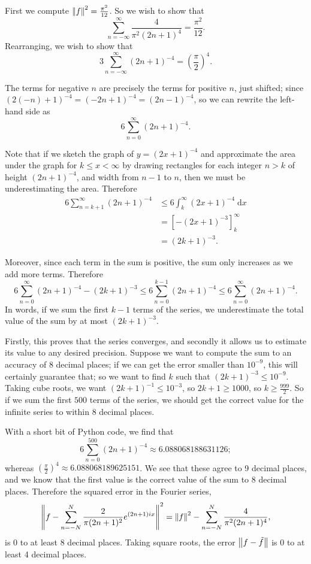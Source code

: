 \documentclass{article}
\newcommand{\diff}{\;\mathrm{d}}
\newcommand{\norm}[1]{\left|\kern-1pt\left|#1\right|\kern-1pt\right|}
\begin{document}
First we compute $\norm{f}^2=\frac{\pi^2}{12}$. So we wish to show that
\[\sum_{n=-\infty}^\infty \frac{4}{\pi^2(2n+1)^4}=\frac{\pi^2}{12}.\]
Rearranging, we wish to show that
\[3\sum_{n=-\infty}^\infty (2n+1)^{-4}=\left(\frac{\pi}{2}\right)^4.\]

The terms for negative $n$ are precisely the terms for positive $n$, just shifted; since $(2(-n)+1)^{-4}=(-2n+1)^{-4}=(2n-1)^{-4}$, so we can rewrite the left-hand side as
\[6\sum_{n=0}^\infty (2n+1)^{-4}.\]


Note that if we sketch the graph of $y=(2x+1)^{-4}$ and approximate the area under the graph for $k\leq x<\infty$ by drawing rectangles for each integer $n> k$ of height $(2n+1)^{-4}$, and width from $n-1$ to $n$, then we must be underestimating the area. Therefore
\begin{align*}
	6\sum_{n=k+1}^\infty (2n+1)^{-4}&\leq 6\int_k^\infty (2x+1)^{-4}\diff x\\
	&=\left[-(2x+1)^{-3}\right]_k^\infty\\
	&= (2k+1)^{-3}.
\end{align*}


Moreover, since each term in the sum is positive, the sum only increases as we add more terms. Therefore
\[6\sum_{n=0}^\infty (2n+1)^{-4}-(2k+1)^{-3}\leq 6\sum_{n=0}^{k-1}(2n+1)^{-4}\leq 6\sum_{n=0}^\infty (2n+1)^{-4}.\]
In words, if we sum the first $k-1$ terms of the series, we underestimate the total value of the sum by at most $(2k+1)^{-3}$.

Firstly, this proves that the series converges, and secondly it allows us to estimate its value to any desired precision. Suppose we want to compute the sum to an accuracy of 8 decimal places; if we can get the error smaller than $10^{-9}$, this will certainly guarantee that; so we want to find $k$ such that $(2k+1)^{-3}\leq 10^{-9}$. Taking cube roots, we want $(2k+1)^{-1}\leq 10^{-3}$, so $2k+1\geq 1000$, so $k\geq\frac{999}{2}$. So if we sum the first $500$ terms of the series, we should get the correct value for the infinite series to within 8 decimal places.

With a short bit of Python code, we find that
\[6\sum_{n=0}^{500} (2n+1)^{-4} \approx 6.088068188631126;\]
whereas $\left(\frac{\pi}{2}\right)^4\approx 6.088068189625151$. We see that these agree to 9 decimal places, and we know that the first value is the correct value of the sum to 8 decimal places. Therefore the squared error in the Fourier series,
\[\norm{f-\sum_{n=-N}^N \frac{2}{\pi (2n+1)^2}e^{(2n+1)ix}}^2=\norm{f}^2-\sum_{n=-N}^N \frac{4}{\pi^2 (2n+1)^4},\]
is 0 to at least 8 decimal places. Taking square roots, the error $\norm{f-\tilde{f}}$ is 0 to at least 4 decimal places.\bigskip
\end{document}
